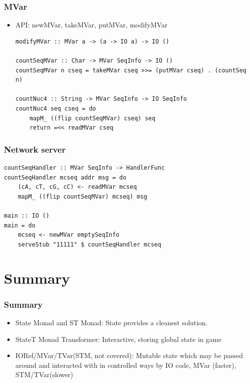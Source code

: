 \begin{frame}[fragile]\frametitle{MVar}

\begin{itemize}
\item
  API: newMVar, takeMVar, putMVar, modifyMVar

\begin{verbatim}
modifyMVar :: MVar a -> (a -> IO a) -> IO () 

countSeqMVar :: Char -> MVar SeqInfo -> IO ()
countSeqMVar n cseq = takeMVar cseq >>= (putMVar cseq) . (countSeq n)

countNuc4 :: String -> MVar SeqInfo -> IO SeqInfo
countNuc4 seq cseq = do
    mapM_ ((flip countSeqMVar) cseq) seq
    return =<< readMVar cseq
\end{verbatim}
\end{itemize}

\end{frame}

\begin{frame}[fragile]\frametitle{Network server}

\begin{verbatim}
countSeqHandler :: MVar SeqInfo -> HandlerFunc
countSeqHandler mcseq addr msg = do
    (cA, cT, cG, cC) <- readMVar mcseq 
    mapM_ ((flip countSeqMVar) mcseq) msg 

main :: IO ()
main = do
    mcseq <- newMVar emptySeqInfo
    serveStub "11111" $ countSeqHandler mcseq 
\end{verbatim}

\end{frame}

\section{Summary}

\begin{frame}\frametitle{Summary}

\begin{itemize}
\item
  State Monad and ST Monad: State provides a cleanest solution.
\item
  StateT Monad Transformer: Interactive, storing global state in game
\item
  IORef/MVar/TVar(STM, not covered): Mutable state which may be passed
  around and interacted with in controlled ways by IO code, MVar
  (faster), STM/TVar(slower)
\end{itemize}

\end{frame}

